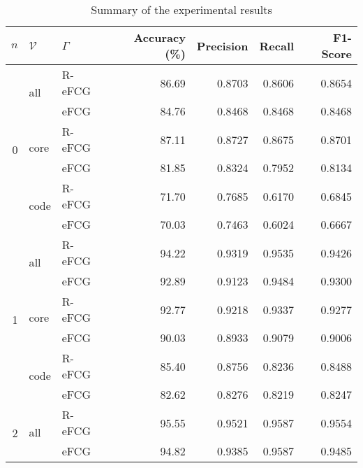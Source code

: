 \begin{table}[]
\scriptsize
\caption{Summary of the experimental results}
\label{tab:res}
\begin{tabular}{@{}rllrrrr@{}}
\toprule
$n$                & $\mathcal{V}$                    & $\Gamma$ & Accuracy (\%) & Precision & Recall & F1-Score \\ \midrule
\multirow[t]{6}{*}{0} & \multirow[t]{2}{*}{$\mathrm{all}$}  & R-eFCG   & 86.69         & 0.8703    & 0.8606 & 0.8654   \\
                   &                                  & eFCG     & 84.76         & 0.8468    & 0.8468 & 0.8468   \\
                   & \multirow[t]{2}{*}{$\mathrm{core}$} & R-eFCG   & 87.11         & 0.8727    & 0.8675 & 0.8701   \\
                   &                                  & eFCG     & 81.85         & 0.8324    & 0.7952 & 0.8134   \\
                   & \multirow[t]{2}{*}{$\mathrm{code}$} & R-eFCG   & 71.70         & 0.7685    & 0.6170 & 0.6845   \\
                   &                                  & eFCG     & 70.03         & 0.7463    & 0.6024 & 0.6667   \\ \midrule
\multirow[t]{6}{*}{1} & \multirow[t]{2}{*}{$\mathrm{all}$}  & R-eFCG   & 94.22         & 0.9319    & 0.9535 & 0.9426   \\
                   &                                  & eFCG     & 92.89         & 0.9123    & 0.9484 & 0.9300   \\
                   & \multirow[t]{2}{*}{$\mathrm{core}$} & R-eFCG   & 92.77         & 0.9218    & 0.9337 & 0.9277   \\
                   &                                  & eFCG     & 90.03         & 0.8933    & 0.9079 & 0.9006   \\
                   & \multirow[t]{2}{*}{$\mathrm{code}$} & R-eFCG   & 85.40         & 0.8756    & 0.8236 & 0.8488   \\
                   &                                  & eFCG     & 82.62         & 0.8276    & 0.8219 & 0.8247   \\ \midrule
\multirow[t]{6}{*}{2} & \multirow[t]{2}{*}{$\mathrm{all}$}  & R-eFCG   & 95.55         & 0.9521    & 0.9587 & 0.9554   \\
                   &                                  & eFCG     & 94.82         & 0.9385    & 0.9587 & 0.9485   \\

\end{tabular}
\end{table}
